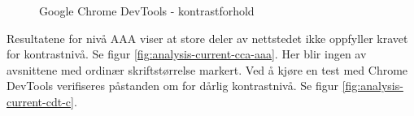 \begin{figure}[H]
    \begin{center}
        \caption{Google Chrome DevTools - kontrastforhold}
        \label{fig:analysis-current-cdt}
    \end{center}
\end{figure}

Resultatene for nivå AAA viser at store deler av nettstedet ikke oppfyller kravet for kontrastnivå. Se figur \ref{fig:analysis-current-cca-aaa}. Her blir ingen av avsnittene med ordinær skriftstørrelse markert. Ved å kjøre en test med Chrome DevTools verifiseres påstanden om for dårlig kontrastnivå. Se figur \ref{fig:analysis-current-cdt-c}.

